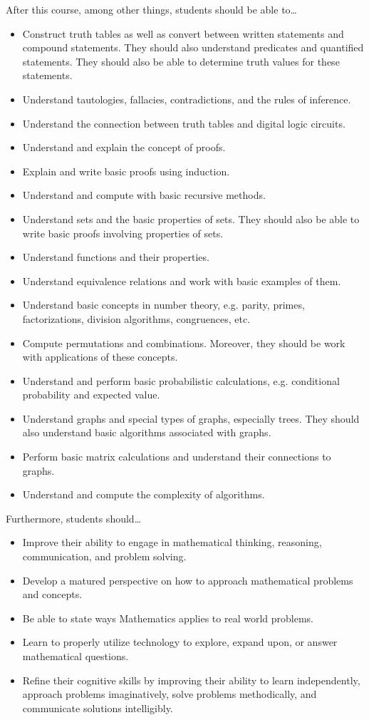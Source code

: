 \documentclass[11pt,letterpaper]{article}
\begin{document}
After this course, among other things, students should be able to\dots
	\begin{itemize} \itemsep=0.25ex
	\item Construct truth tables as well as convert between written statements and compound statements. They should also understand predicates and quantified statements. They should also be able to determine truth values for these statements. 
	\item Understand tautologies, fallacies, contradictions, and the rules of inference.
	\item Understand the connection between truth tables and digital logic circuits.
	\item Understand and explain the concept of proofs.
	\item Explain and write basic proofs using induction.
	\item Understand and compute with basic recursive methods.
	\item Understand sets and the basic properties of sets. They should also be able to write basic proofs involving properties of sets. 
	\item Understand functions and their properties.
	\item Understand equivalence relations and work with basic examples of them.
	\item Understand basic concepts in number theory, e.g. parity, primes, factorizations, division algorithms, congruences, etc. 
	\item Compute permutations and combinations. Moreover, they should be work with applications of these concepts. 
	\item Understand and perform basic probabilistic calculations, e.g. conditional probability and expected value.
	\item Understand graphs and special types of graphs, especially trees. They should also understand basic algorithms associated with graphs. 
	\item Perform basic matrix calculations and understand their connections to graphs.
	\item Understand and compute the complexity of algorithms.
	\end{itemize}
Furthermore, students should\dots
	\begin{itemize} \itemsep=0.25ex
	\item  Improve their ability to engage in mathematical thinking, reasoning, communication, and problem solving.
	\item Develop a matured perspective on how to approach mathematical problems and concepts.
	\item Be able to state ways Mathematics applies to real world problems.
	\item Learn to properly utilize technology to explore, expand upon, or answer mathematical questions.
	\item Refine their cognitive skills by improving their ability to learn independently, approach problems imaginatively, solve problems methodically, and communicate solutions intelligibly.
	\end{itemize}
\sectionbreak
\end{document}
